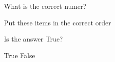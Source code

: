 \documentclass[letterpaper,10pt]{article}
\begin{document}
\begin{compactenum}
\begin{minipage}{\linewidth}
    \end{minipage}

    \vspace{10pt}

\begin{minipage}{\linewidth}
    \item \label{5} What is the correct numer?
    
    \end{minipage}

    \vspace{10pt}

\begin{minipage}{\linewidth}
    \item \label{6} Put these items in the correct order
    
    \end{minipage}

    \vspace{10pt}

\begin{minipage}{\linewidth}
    \item \label{7} Is the answer True?

        True \hskip 1cm False
    
    \end{minipage}

    \vspace{10pt}

\end{compactenum}
\end{document}
